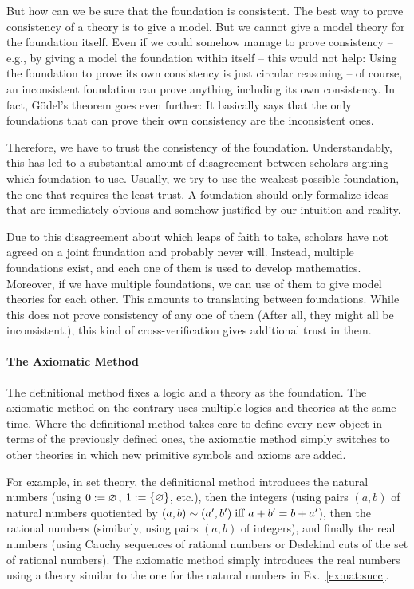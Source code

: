 But how can we be sure that the foundation is consistent. The best way to prove consistency of a theory is to give a model. But we cannot give a model theory for the foundation itself. Even if we could somehow manage to prove consistency -- e.g., by giving a model the foundation within itself -- this would not help: Using the foundation to prove its own consistency is just circular reasoning -- of course, an inconsistent foundation can prove anything including its own consistency. In fact, G\"odel's theorem goes even further: It basically says that the only foundations that can prove their own consistency are the inconsistent ones.

Therefore, we have to trust the consistency of the foundation. Understandably, this has led to a substantial amount of disagreement between scholars arguing which foundation to use. Usually, we try to use the weakest possible foundation, the one that requires the least trust. A foundation should only formalize ideas that are immediately obvious and somehow justified by our intuition and reality.

Due to this disagreement about which leaps of faith to take, scholars have not agreed on a joint foundation and probably never will. Instead, multiple foundations exist, and each one of them is used to develop mathematics. Moreover, if we have multiple foundations, we can use of them to give model theories for each other. This amounts to translating between foundations. While this does not prove consistency of any one of them (After all, they might all be inconsistent.), this kind of cross-verification gives additional trust in them.

\paragraph{The Axiomatic Method}
The definitional method fixes a logic and a theory as the foundation. The axiomatic method on the contrary uses multiple logics and theories at the same time.
Where the definitional method takes care to define every new object in terms of the previously defined ones, the axiomatic method simply switches to other theories in which new primitive symbols and axioms are added.

For example, in set theory, the definitional method introduces the natural numbers (using $0:=\varnothing$, $1:=\{\varnothing\}$, etc.), then the integers (using pairs $(a,b)$ of natural numbers quotiented by $(a,b)\sim (a',b') \;\mathrm{iff}\; a+b'=b+a'$), then the rational numbers (similarly, using pairs $(a,b)$ of integers), and finally the real numbers (using Cauchy sequences of rational numbers or Dedekind cuts of the set of rational numbers).
The axiomatic method simply introduces the real numbers using a theory similar to the one for the natural numbers in Ex.~\ref{ex:nat:succ}.

